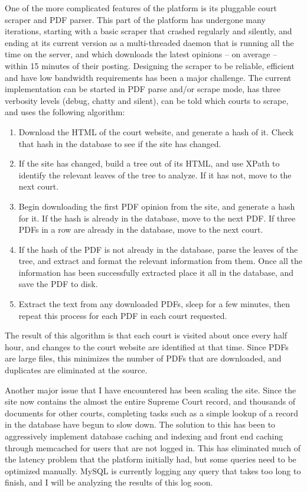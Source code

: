 One of the more complicated features of the platform is its pluggable court scraper and PDF parser. This part of the platform has undergone many iterations, starting with a basic scraper that crashed regularly and silently, and ending at its current version as a multi-threaded daemon that is running all the time on the server, and which downloads the latest opinions -- on average -- within 15 minutes of their posting. Designing the scraper to be reliable, efficient and have low bandwidth requirements has been a major challenge. The current implementation can be started in PDF parse and/or scrape mode, has three verbosity levels (debug, chatty and silent), can be told which courts to scrape, and uses the following algorithm:
\begin{enumerate}
    \item{Download the HTML of the court website, and generate a hash of it. Check that hash in the database to see if the site has changed.}
    \item{If the site has changed, build a tree out of its HTML, and use XPath to identify the relevant leaves of the tree to analyze. If it has not, move to the next court.}
    \item{Begin downloading the first PDF opinion from the site, and generate a hash for it. If the hash is already in the database, move to the next PDF. If three PDFs in a row are already in the database, move to the next court.}
    \item{If the hash of the PDF is not already in the database, parse the leaves of the tree, and extract and format the relevant information from them. Once all the information has been successfully extracted place it all in the database, and save the PDF to disk.}
    \item{Extract the text from any downloaded PDFs, sleep for a few minutes, then repeat this process for each PDF in each court requested.}
\end{enumerate}
The result of this algorithm is that each court is visited about once every half hour, and changes to the court website are identified at that time. Since PDFs are large files, this minimizes the number of PDFs that are downloaded, and duplicates are eliminated at the source.

Another major issue that I have encountered has been scaling the site. Since the site now contains the almost the entire Supreme Court record, and thousands of documents for other courts, completing tasks such as a simple lookup of a record in the database have begun to slow down. The solution to this has been to aggressively implement database caching and indexing and front end caching through memcached for users that are not logged in. This has eliminated much of the latency problem that the platform initially had, but some queries need to be optimized manually. MySQL is currently logging any query that takes too long to finish, and I will be analyzing the results of this log soon.
